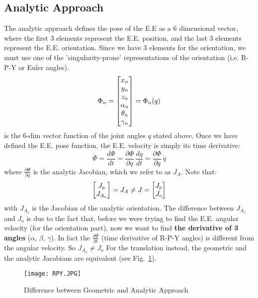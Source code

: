 \subsection{Analytic Approach}
                    The analytic approach defines the pose of the E.E as a 6 dimensional vector, where the first 3 elements represent the E.E. position, and the last 3 elements represent the E.E. orientation.
                    Since we have 3 elements for the orientation, we must use one of the 'singularity-prone' representations of the orientation (i.e. R-P-Y or Euler angles).
                    $$
                    \Phi_n =
                    \begin{bmatrix}
                        x_n\\
                        y_n\\
                        z_n\\
                        \alpha_n\\
                        \theta_n\\
                        \gamma_n\\
                    \end{bmatrix} = \Phi_n(q)
                    $$
                    is the 6-dim vector function of the joint angles $q$ stated above.
                    Once we have defined the E.E. pose function, the E.E. velocity is simply its time derivative:
                    $$
                    \dot{\Phi} = \frac{d\Phi}{dt} = \frac{\partial\Phi}{\partial q} \, \frac{dq}{dt} = \frac{\partial\Phi}{\partial q} \, \dot{q}
                    $$
                    where $\frac{\partial\Phi}{\partial q}$ is the analytic Jacobian, which we refer to as $J_A$.
                    Note that:
                    \begin{equation}
                        \begin{bmatrix}
                            J_p\\
                            J_{A_o}
                        \end{bmatrix}
                         = J_A \neq J = 
                        \begin{bmatrix}
                            J_p\\
                            J_o
                        \end{bmatrix}
                    \end{equation}
                    with $J_{A_o}$ is the Jacobian of the analytic orientation.
                    The difference between $J_{A_o}$ and $J_o$ is due to the fact that, before we were trying to find the E.E. angular velocity (for the orientation part), now we want to find \textbf{the derivative of 3 angles} ($\alpha$, $\beta$, $\gamma$). 
                    In fact the $\frac{d\Phi}{dt}$ (time derivative of R-P-Y angles) is different from the angular velocity.
                    So $ J_{A_o} \neq J_o$
                    For the translation instead, the geometric and the analytic Jacobians are equivalent (see Fig.~\ref{fig:geom_vs_anal_jac}).
%                    
                    \begin{figure}[htp]    
                    	\centering
                        \texttt{[image: RPY.JPG]}
                        \caption{Difference between Geometric and Analytic Approach}
                        \label{fig:geom_vs_anal_jac}
                    \end{figure}
                
